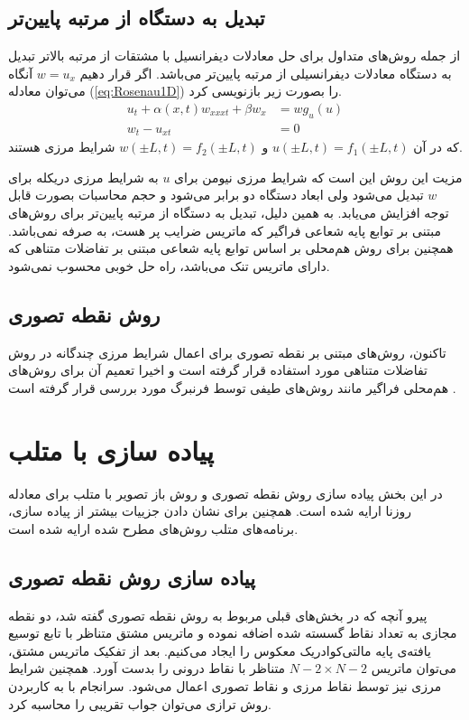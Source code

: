 \subsection{تبدیل به دستگاه از مرتبه پایین‌تر}

از جمله روش‌های متداول برای حل معادلات دیفرانسیل با مشتقات از مرتبه بالاتر تبدیل به دستگاه معادلات دیفرانسیلی از مرتبه پایین‌تر می‌باشد. اگر قرار دهیم
$w = u_x$
آنگاه می‌توان معادله
(\ref{eq:Rosenau1D}) 
را بصورت زیر بازنویسی کرد.
\begin{align}
	u_t + \alpha(x,t)w_{xxxt}+\beta w_x &= wg_u(u)\\
	w_t - u_{xt} &= 0
\end{align}
که در آن 
$u(\pm L,t)=f_1(\pm L,t)$ 
و
$w(\pm L,t)=f_2(\pm L,t)$
شرایط مرزی هستند. 


مزیت این روش این است که شرایط مرزی نیومن
برای $u$ به شرایط مرزی دریکله
برای $w$ تبدیل می‌شود ولی ابعاد دستگاه دو برابر می‌شود و حجم محاسبات بصورت قابل توجه افزایش می‌یابد. به همین دلیل، تبدیل به دستگاه از مرتبه پایین‌تر برای روش‌های مبتنی بر توابع پایه شعاعی فراگیر که ماتریس ضرایب پر هست، به صرفه نمی‌باشد. همچنین برای روش ‌هم‌محلی بر اساس توابع پایه شعاعی مبتنی بر تفاضلات متناهی که دارای ماتریس تنک می‌باشد، راه حل خوبی محسوب نمی‌شود. 

\subsection{روش نقطه تصوری}

تاکنون، روش‌های مبتنی بر نقطه تصوری برای اعمال شرایط مرزی چندگانه در روش تفاضلات متناهی مورد استفاده قرار گرفته است و اخیرا تعمیم آن برای روش‌های هم‌محلی فراگیر مانند روش‌‌های طیفی توسط فرنبرگ
مورد بررسی قرار گرفته است
\citep{Fornberg}.



\section{پیاده سازی با متلب}

در این بخش پیاده سازی روش نقطه تصوری و روش باز تصویر با متلب برای معادله روزنا ارایه شده است. همچنین برای نشان دادن جزییات بیشتر از پیاده سازی، برنامه‌های متلب روش‌های مطرح شده ارایه شده است.

\subsection{ پیاده سازی روش نقطه تصوری}

پیرو آنچه که در بخش‌های قبلی مربوط به روش نقطه تصوری گفته شد، دو نقطه مجازی به تعداد نقاط  گسسته شده اضافه نموده و ماتریس مشتق متناظر با تابع توسیع یافته‌ی پایه‌ مالتی‌کوادریک معکوس را ایجاد می‌کنیم. بعد از تفکیک ماتریس مشتق، می‌توان ماتریس 
$N-2\times N-2$
متناظر با نقاط درونی را بدست آورد. همچنین شرایط مرزی نیز توسط نقاط مرزی و نقاط تصوری اعمال می‌شود. سرانجام با به کاربردن روش ترازی می‌توان جواب تقریبی را محاسبه کرد.

